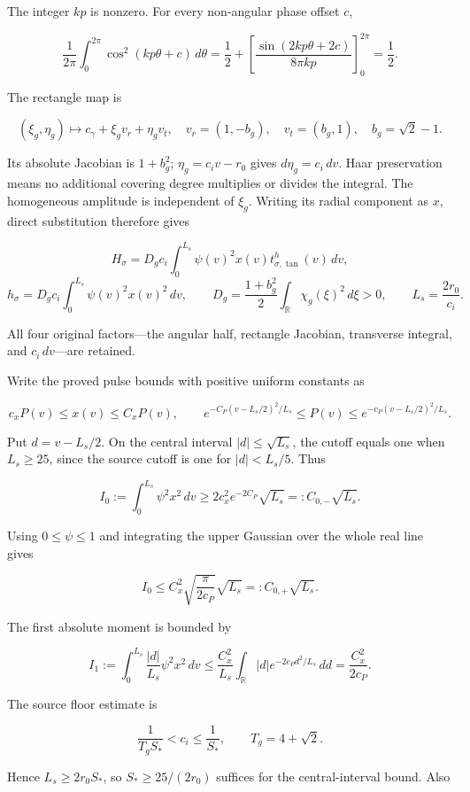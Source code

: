 \documentclass[10pt,a4paper]{article}
\begin{document}
The integer \(kp\) is nonzero. For every non-angular phase offset \(c\),

\[
\frac1{2\pi}\int_0^{2\pi}\cos^2(kp\theta+c)\,d\theta
=\frac12+
\left[\frac{\sin(2kp\theta+2c)}{8\pi kp}\right]_0^{2\pi}
=\frac12.
\]

The rectangle map is

\[
(\xi_g,\eta_g)\longmapsto c_\gamma+\xi_gv_r+\eta_gv_t,
\quad v_r=(1,-b_g),\quad v_t=(b_g,1),\quad b_g=\sqrt2-1.
\]

Its absolute Jacobian is \(1+b_g^2\); \(\eta_g=c_iv-r_0\) gives \(d\eta_g=c_i\,dv\). Haar preservation means no additional covering degree multiplies or divides the integral. The homogeneous amplitude is independent of \(\xi_g\). Writing its radial component as \(x\), direct substitution therefore gives

\[
H_\sigma=D_gc_i\int_0^{L_s}\psi(v)^2x(v)t_{\sigma,\tan}^h(v)\,dv,
\] \[
h_\sigma=D_gc_i\int_0^{L_s}\psi(v)^2x(v)^2\,dv,
\qquad
D_g=\frac{1+b_g^2}{2}\int_{\mathbb R}\chi_g(\xi)^2\,d\xi>0,
\qquad L_s=\frac{2r_0}{c_i}.
\]

All four original factors---the angular half, rectangle Jacobian, transverse integral, and \(c_i\,dv\)---are retained.

Write the proved pulse bounds with positive uniform constants as

\[
c_xP(v)\le x(v)\le C_xP(v),\qquad
e^{-C_P(v-L_s/2)^2/L_s}\le P(v)
\le e^{-c_P(v-L_s/2)^2/L_s}.
\]

Put \(d=v-L_s/2\). On the central interval \(|d|\le\sqrt{L_s}\), the cutoff equals one when \(L_s\ge25\), since the source cutoff is one for \(|d|<L_s/5\). Thus

\[
I_0:=\int_0^{L_s}\psi^2x^2\,dv
\ge 2c_x^2e^{-2C_P}\sqrt{L_s}=:C_{0,-}\sqrt{L_s}.
\]

Using \(0\le\psi\le1\) and integrating the upper Gaussian over the whole real line gives

\[
I_0\le C_x^2\sqrt{\frac{\pi}{2c_P}}\sqrt{L_s}
=:C_{0,+}\sqrt{L_s}.
\]

The first absolute moment is bounded by

\[
I_1:=\int_0^{L_s}\frac{|d|}{L_s}\psi^2x^2\,dv
\le\frac{C_x^2}{L_s}\int_{\mathbb R}|d|e^{-2c_Pd^2/L_s}\,dd
=\frac{C_x^2}{2c_P}.
\]

The source floor estimate is

\[
\frac{1}{T_gS_*}<c_i\le\frac1{S_*},\qquad T_g=4+\sqrt2.
\]

Hence \(L_s\ge2r_0S_*\), so \(S_*\ge25/(2r_0)\) suffices for the central-interval bound. Also
\end{document}
